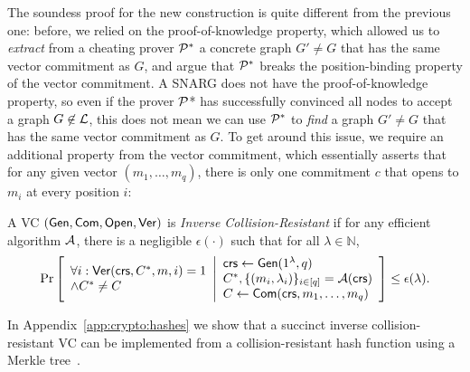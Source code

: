The soundess proof for the new construction is quite different from the previous one:
before, we relied on the proof-of-knowledge property, which allowed us to \emph{extract}
from a cheating prover $\mathcal{P}^*$
a concrete graph $G' \neq G$ that has the same vector commitment as $G$,
and argue that $\mathcal{P}^*$ breaks the position-binding property of the vector commitment.
A SNARG does not have the proof-of-knowledge property,
so even if the prover $\mathcal{P}$* has successfully convinced all nodes to accept a graph $G \not \in \mathcal{L}$,
this does not mean we can use $\mathcal{P}^*$ to \emph{find} a graph $G' \neq G$ that has the same vector commitment as $G$.
To get around this issue,
we require an additional property from the vector commitment,
which essentially asserts that for any given vector $(m_1,\ldots,m_q)$,
there is only one commitment $c$ that opens to $m_i$ at every position $i$:
\begin{definition}
A VC $(\mathsf{Gen}, \mathsf{Com}, \mathsf{Open}, \mathsf{Ver})$ is \emph{Inverse Collision-Resistant} if for any efficient algorithm $\mathcal{A}$, there
is a negligible $\epsilon(\cdot)$ such that for all $\lambda\in \mathbb{N}$,
\begin{gather*}
    \underset{}{\text{Pr}}\left [
    \begin{array}{ll}
         \forall i: \mathsf{Ver}(\mathsf{crs}, C^*, m, i) = 1 \\
         \wedge C^* \neq C
    \end{array}
    \middle\vert
    \begin{array}{ll}
         \mathsf{crs} \leftarrow \mathsf{Gen}(1^\lambda, q) \\
         C^*, \{(m_i, \lambda_i)\}_{i\in [q]} = \mathcal{A}(\mathsf{crs}) \\
         C \leftarrow \mathsf{Com}(\mathsf{crs}, m_1,\ldots,m_q)
    \end{array}
    \right ] \leq \epsilon(\lambda).
\end{gather*}
\end{definition}
In Appendix~\ref{app:crypto:hashes} we show that a succinct inverse collision-resistant VC can be implemented from 
a collision-resistant hash function using a Merkle tree~\cite{merkle1989certified}.

